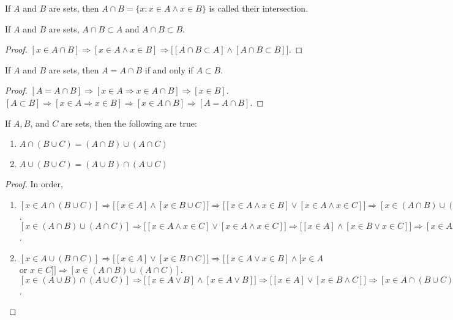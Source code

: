 \documentclass[crop=false,class=article,oneside]{standalone}
\begin{document}
        \begin{definition}
        If $A$ and $B$ are sets, then $A\cap B = \{x:x\in A \land x\in B\}$ is called their intersection.
        \end{definition}
        \begin{corollary}
        If $A$ and $B$ are sets, $A\cap B \subset A$ and $A\cap B \subset B$.
        \end{corollary}
        \begin{proof}
        $[x\in A\cap B]\Rightarrow [x\in A\land x\in B]\Rightarrow \big[[A\cap B \subset A]\land [A\cap B \subset B]\big]$.
        \end{proof}
        \begin{theorem}
        If $A$ and $B$ are sets, then $A=A\cap B$ if and only if $A\subset B$.
        \end{theorem}
        \begin{proof}
        $[A=A\cap B]\Rightarrow [x\in A\Rightarrow x\in A \cap B]\Rightarrow [x\in B]$. $[A\subset B]\Rightarrow [x\in A\Rightarrow x\in B]\Rightarrow [x\in A\cap B]\Rightarrow [A=A\cap B]$.
        \end{proof}
        \begin{theorem}
        If $A,B$, and $C$ are sets, then the following are true:
        \begin{enumerate}
        \item $A\cap (B\cup C) = (A\cap B)\cup (A\cap C)$
        \item $A\cup (B\cup C) = (A\cup B)\cap (A\cup C)$
        \end{enumerate}
        \end{theorem}
        \begin{proof}
        In order,
        \begin{enumerate}
        \item $[x\in A\cap (B\cup C)]\Rightarrow \big[[x\in A] \land [x\in B\cup C]\big]\Rightarrow \big[[x\in A\land x\in B]\lor [x\in A\land x\in C]\big]\Rightarrow [x\in (A\cap B)\cup (A\cap C)]$. $[x\in (A\cap B)\cup(A\cap C)]\Rightarrow \big[[x\in A\land x\in C]\lor [x\in A \land x\in C]\big]\Rightarrow \big[[x\in A]\land [x\in B\lor x\in C]\big]\Rightarrow [x\in A\cap(B\cup C)]$.
        \item $[x\in A\cup (B\cap C)]\Rightarrow \big[[x\in A]\lor [x\in B\cap C]\big] \Rightarrow \big[[x\in A \lor x\in B]\land [x\in A$ or $x\in C]\big]\Rightarrow [x\in (A\cap B)\cup (A\cap C)]$. $[x\in (A\cup B)\cap (A\cup C)]\Rightarrow \big[[x\in A\lor B]\land [x\in A\lor B]\big]\Rightarrow \big[[x\in A]\lor[x\in B\land C]\big]\Rightarrow [x\in A\cap(B\cup C)]$.
        \end{enumerate}
        \end{proof}
\end{document}
